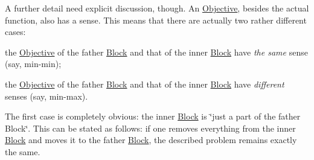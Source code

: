 A further detail need explicit discussion, though. An \mbox{\hyperlink{class_s_m_spp__di__unipi__it_1_1_objective}{Objective}}, besides the actual function, also has a sense. This means that there are actually two rather different cases\+:


\begin{DoxyItemize}
\item the \mbox{\hyperlink{class_s_m_spp__di__unipi__it_1_1_objective}{Objective}} of the father \mbox{\hyperlink{class_s_m_spp__di__unipi__it_1_1_block}{Block}} and that of the inner \mbox{\hyperlink{class_s_m_spp__di__unipi__it_1_1_block}{Block}} have {\itshape the same} sense (say, min-\/min);
\item the \mbox{\hyperlink{class_s_m_spp__di__unipi__it_1_1_objective}{Objective}} of the father \mbox{\hyperlink{class_s_m_spp__di__unipi__it_1_1_block}{Block}} and that of the inner \mbox{\hyperlink{class_s_m_spp__di__unipi__it_1_1_block}{Block}} have {\itshape different} senses (say, min-\/max).
\end{DoxyItemize}

The first case is completely obvious\+: the inner \mbox{\hyperlink{class_s_m_spp__di__unipi__it_1_1_block}{Block}} is \char`\"{}just a part of
the father Block\char`\"{}. This can be stated as follows\+: if one removes everything from the inner \mbox{\hyperlink{class_s_m_spp__di__unipi__it_1_1_block}{Block}} and moves it to the father \mbox{\hyperlink{class_s_m_spp__di__unipi__it_1_1_block}{Block}}, the described problem remains exactly the same.

